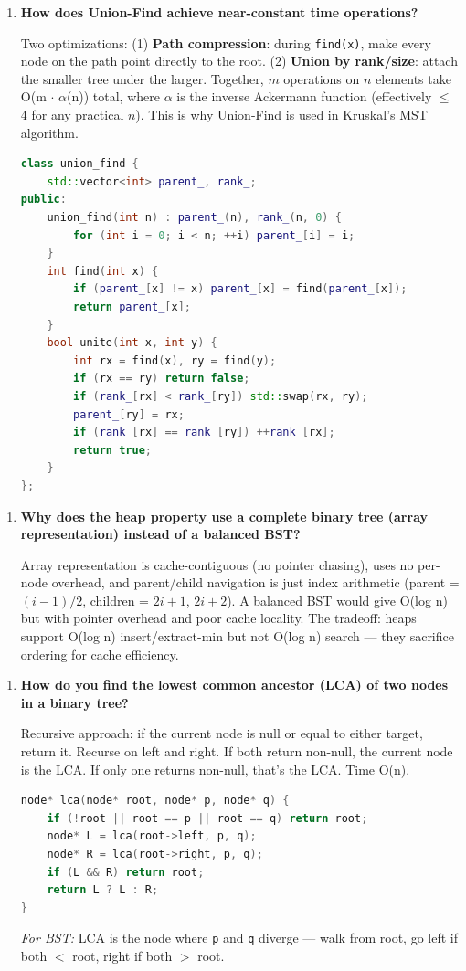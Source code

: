 \begin{enumerate}
\item \textbf{How does Union-Find achieve near-constant time operations?}

Two optimizations: (1) \textbf{Path compression}: during \texttt{find(x)}, make every node on the path point directly to the root. (2) \textbf{Union by rank/size}: attach the smaller tree under the larger. Together, $m$ operations on $n$ elements take O(m $\cdot$ $\alpha$(n)) total, where $\alpha$ is the inverse Ackermann function (effectively $\leq$ 4 for any practical $n$). This is why Union-Find is used in Kruskal's MST algorithm.

\begin{lstlisting}[language=C++]
class union_find {
    std::vector<int> parent_, rank_;
public:
    union_find(int n) : parent_(n), rank_(n, 0) {
        for (int i = 0; i < n; ++i) parent_[i] = i;
    }
    int find(int x) {
        if (parent_[x] != x) parent_[x] = find(parent_[x]);
        return parent_[x];
    }
    bool unite(int x, int y) {
        int rx = find(x), ry = find(y);
        if (rx == ry) return false;
        if (rank_[rx] < rank_[ry]) std::swap(rx, ry);
        parent_[ry] = rx;
        if (rank_[rx] == rank_[ry]) ++rank_[rx];
        return true;
    }
};
\end{lstlisting}
\end{enumerate}

\begin{enumerate}
\item \textbf{Why does the heap property use a complete binary tree (array representation) instead of a balanced BST?}

Array representation is cache-contiguous (no pointer chasing), uses no per-node overhead, and parent/child navigation is just index arithmetic (parent = $(i-1)/2$, children = $2i+1$, $2i+2$). A balanced BST would give O(log n) but with pointer overhead and poor cache locality. The tradeoff: heaps support O(log n) insert/extract-min but not O(log n) search --- they sacrifice ordering for cache efficiency.
\end{enumerate}

\begin{enumerate}
\item \textbf{How do you find the lowest common ancestor (LCA) of two nodes in a binary tree?}

Recursive approach: if the current node is null or equal to either target, return it. Recurse on left and right. If both return non-null, the current node is the LCA. If only one returns non-null, that's the LCA. Time O(n).

\begin{lstlisting}[language=C++]
node* lca(node* root, node* p, node* q) {
    if (!root || root == p || root == q) return root;
    node* L = lca(root->left, p, q);
    node* R = lca(root->right, p, q);
    if (L && R) return root;
    return L ? L : R;
}
\end{lstlisting}

\textit{For BST:} LCA is the node where \texttt{p} and \texttt{q} diverge — walk from root, go left if both $<$ root, right if both $>$ root.
\end{enumerate}

